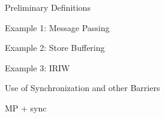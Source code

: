 \documentclass[notes, xcolor=dvipsnames]{beamer}
\begin{document}
    \begin{frame}{Preliminary Definitions}
        
    \end{frame}

    \begin{frame}{Example 1: Message Passing}

    \end{frame}

    \begin{frame}{Example 2: Store Buffering}
        
    \end{frame}

    \begin{frame}{Example 3: IRIW}

    \end{frame}

    \begin{frame}{Use of Synchronization and other Barriers}
        
    \end{frame}

    \begin{frame}{MP + sync}
        
    \end{frame}
\end{document}
